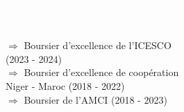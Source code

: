 \documentclass[theme]{cv_einstein}
\begin{document}
\begin{paracol}{2}
       
        
\begin{leftcolumn} \noindent \small
    \textcolor{white}{\: \faLineChart\ Bourse }
    \textcolor{white}{\:\faSoccerBallO \ Football} \textcolor{white}{\: \faGamepad\ Jeux vidéo}  \\
    \textcolor{white}{\: \faBook\ Lecture}
    \textcolor{white}{\: \faLeaf\ Écologie}
    \textcolor{white}{\: \faPlane\ Voyages }
\end{leftcolumn}
        \begin{leftcolumn}\noindent \footnotesize
        {\color{white}
\normalsize 
 $\Longrightarrow$ Boursier d'excellence de l'ICESCO \\  (2023 - 2024) \\ [0.5em]
 $\Longrightarrow$  Boursier d'excellence de coopération \\ \;\;\;\; Niger - Maroc  (2018 - 2022) \\ [0.5em]
 $\Longrightarrow$ Boursier de l'AMCI (2018 - 2023)

}
\end{leftcolumn}
\end{paracol}
\end{document}
